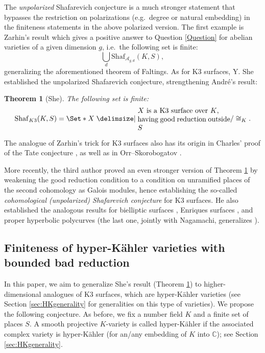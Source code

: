 \documentclass[11pt,reqno,oneside]{amsart}
\numberwithin{equation}{section}
\newtheorem{theorem}{Theorem}[section]
\theoremstyle{definition}
\newcommand{\Sha}{\mathrm{Shaf}}
\begin{document}
The \textit{unpolarized} Shafarevich conjecture is a much stronger statement that bypasses the restriction on polarizations (e.g.~degree or natural embedding) in the finiteness statements in the above polarized version. The first example is Zarhin's result \cite{ZarhinTrick85} which gives a positive answer to Question \ref{Question} for abelian varieties of a given dimension $g$, i.e.~the following set is finite:
\[\bigcup_{d}\Sha_{\mathcal{A}_{g,d}}(K, S),\]
generalizing the aforementioned theorem of Faltings.
As for K3 surfaces, Y. She \cite{Sh17} established  the unpolarized Shafarevich conjecture, strengthening Andr\'e's result:
\begin{theorem}[She]\label{Thm:She}
The following set is finite:
	\begin{equation*}
		\Sha_{\rm K3}(K,S)=\Set*{X \given \parbox{13em}{$X$ is a K3 surface over $K$,\\
		having good reduction outside $S$}}/ \cong_{K}.
	\end{equation*}
\end{theorem}
The analogue of Zarhin's trick for K3 surfaces also has its origin in Charles' proof of the Tate conjecture \cite{Ch16}, as well as in Orr--Skorobogatov \cite{OrrSkorobogatov}.

More recently, the third author \cite{Takamatsu2020K3} proved an even stronger version of Theorem \ref{Thm:She} by weakening the good reduction condition to a condition on unramified places of the second cohomology as Galois modules, hence establishing the so-called \emph{cohomological (unpolarized) Shafarevich conjecture} for K3 surfaces.
He also established the analogous results for bielliptic surfaces \cite{takamatsu-Bielliptic}, Enriques surfaces \cite{Takamatsu2021a}, and proper hyperbolic polycurves \cite{Nagamachi2019} (the last one, jointly with Nagamachi, generalizes \cite{Javanpeykar-CanPolarizedSurface}).


\subsection{Finiteness of hyper-Kähler varieties with bounded bad reduction}
In this paper, we aim to generalize She's result (Theorem \ref{Thm:She}) to higher-dimensional analogues of K3 surfaces, which are hyper-Kähler varieties (see Section \ref{sec:HKgenerality} for generalities on this type of varieties). We propose the following conjecture. As before, we fix a number field $K$ and a finite set of places $S$. A smooth projective $K$-variety is called hyper-Kähler if the associated complex variety is hyper-Kähler (for an/any embedding of $K$ into $\mathbb{C}$); see Section \ref{sec:HKgenerality}.
\end{document}
